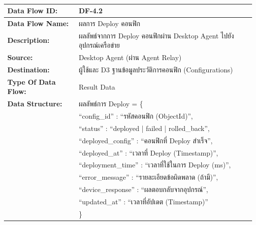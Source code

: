 \begin{table}[H]
    \caption{}
    \label{tab:df-4-2}
    \fontSixTeen 
    \begin{tabularx}{\textwidth}{|l|L|} 
        \hline
        \textbf{Data Flow ID:} & DF-4.2 \\
        \hline
        \textbf{Data Flow Name:} & ผลการ Deploy คอนฟิก \\
        \hline
        \textbf{Description:} & ผลลัพธ์จากการ Deploy คอนฟิกผ่าน Desktop Agent ไปยังอุปกรณ์เครือข่าย \\
        \hline
        \textbf{Source:} & Desktop Agent (ผ่าน Agent Relay) \\
        \hline
        \textbf{Destination:} & ผู้ใช้และ D3 ฐานข้อมูลประวัติการคอนฟิก (Configurations) \\
        \hline
        \textbf{Type Of Data Flow:} & Result Data \\
        \hline
        \textbf{Data Structure:} & ผลลัพธ์การ Deploy = \{ \nonumber \\
                        & \hspace{1em} ``config\_id'' : ``รหัสคอนฟิก (ObjectId)'', \nonumber \\
                        & \hspace{1em} ``status'' : ``deployed | failed | rolled\_back'', \nonumber \\
                        & \hspace{1em} ``deployed\_config'' : ``คอนฟิกที่ Deploy สำเร็จ'', \nonumber \\
                        & \hspace{1em} ``deployed\_at'' : ``เวลาที่ Deploy (Timestamp)'', \nonumber \\
                        & \hspace{1em} ``deployment\_time'' : ``เวลาที่ใช้ในการ Deploy (ms)'', \nonumber \\
                        & \hspace{1em} ``error\_message'' : ``รายละเอียดข้อผิดพลาด (ถ้ามี)'', \nonumber \\
                        & \hspace{1em} ``device\_response'' : ``ผลตอบกลับจากอุปกรณ์'', \nonumber \\
                        & \hspace{1em} ``updated\_at'' : ``เวลาที่อัปเดต (Timestamp)'' \nonumber \\
                        & \} \\
        \hline
    \end{tabularx}
\end{table}

